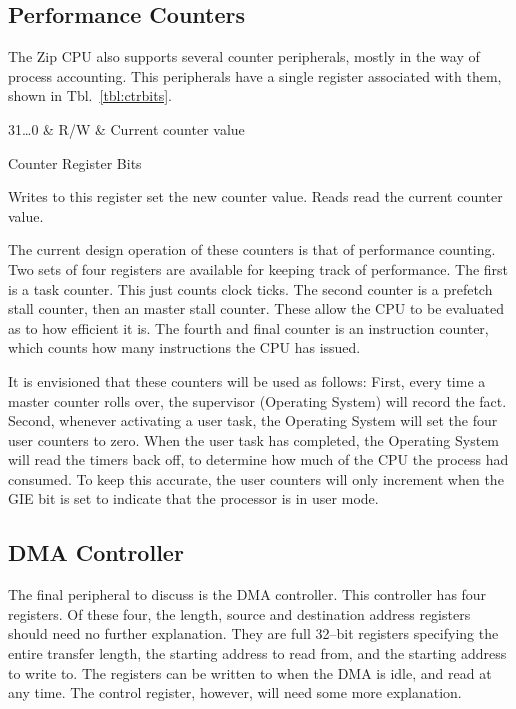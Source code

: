 \documentclass{gqtekspec}
\begin{document}
\subsection{Performance Counters}

The Zip CPU also supports several counter peripherals, mostly in the way of
process accounting.  This peripherals have a single register associated with
them, shown in Tbl.~\ref{tbl:ctrbits}.
\begin{table}\begin{center}
\begin{bitlist}
31\ldots 0 & R/W & Current counter value\\\hline
\end{bitlist}
\caption{Counter Register Bits}\label{tbl:ctrbits}
\end{center}\end{table}
Writes to this register set the new counter value.  Reads read the current
counter value.  

The current design operation of these counters is that of performance counting.
Two sets of four registers are available for keeping track of performance.
The first is a task counter.  This just counts clock ticks.  The second
counter is a prefetch stall counter, then an master stall counter.  These
allow the CPU to be evaluated as to how efficient it is.  The fourth and
final counter is an instruction counter, which counts how many instructions the
CPU has issued.

It is envisioned that these counters will be used as follows: First, every time
a master counter rolls over, the supervisor (Operating System) will record
the fact.  Second, whenever activating a user task, the Operating System will
set the four user counters to zero.  When the user task has completed, the
Operating System will read the timers back off, to determine how much of the
CPU the process had consumed.  To keep this accurate, the user counters will
only increment when the GIE bit is set to indicate that the processor is
in user mode.

\subsection{DMA Controller}

The final peripheral to discuss is the DMA controller.  This controller
has four registers.  Of these four, the length, source and destination address
registers should need no further explanation.  They are full 32--bit registers
specifying the entire transfer length, the starting address to read from, and
the starting address to write to.  The registers can be written to when the
DMA is idle, and read at any time.  The control register, however, will need
some more explanation.
\end{document}
